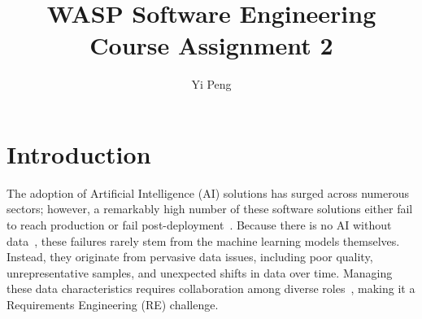 \newenvironment{theorem}[2][Theorem]{\begin{trivlist}
\item[\hskip \labelsep {\bfseries #1}\hskip \labelsep {\bfseries #2.}]}{\end{trivlist}}
\newenvironment{lemma}[2][Lemma]{\begin{trivlist}
\item[\hskip \labelsep {\bfseries #1}\hskip \labelsep {\bfseries #2.}]}{\end{trivlist}}
\newenvironment{exercise}[2][Exercise]{\begin{trivlist}
\item[\hskip \labelsep {\bfseries #1}\hskip \labelsep {\bfseries #2.}]}{\end{trivlist}}
\newenvironment{problem}[2][Problem]{\begin{trivlist}
\item[\hskip \labelsep {\bfseries #1}\hskip \labelsep {\bfseries #2.}]}{\end{trivlist}}
\newenvironment{question}[2][Question]{\begin{trivlist}
\item[\hskip \labelsep {\bfseries #1}\hskip \labelsep {\bfseries #2.}]}{\end{trivlist}}
\newenvironment{corollary}[2][Corollary]{\begin{trivlist}
\item[\hskip \labelsep {\bfseries #1}\hskip \labelsep {\bfseries #2.}]}{\end{trivlist}}

\newenvironment{solution}{\begin{proof}[Solution]}{\end{proof}}
 

 
 
\title{WASP Software Engineering Course Assignment 2}
\author{Yi Peng} 
 
\maketitle

\section{Introduction}
The adoption of Artificial Intelligence (AI) solutions has surged across numerous sectors; however, a remarkably high number of these software solutions either fail to reach production or fail post-deployment~\cite{herremans2021aistrom}. Because there is no AI without data~\cite{groger2021there}, these failures rarely stem from the machine learning models themselves. Instead, they originate from pervasive data issues, including poor quality, unrepresentative samples, and unexpected shifts in data over time. Managing these data characteristics requires collaboration among diverse roles~\cite{de2019understanding,nahar2022collaboration}, making it a Requirements Engineering (RE) challenge.


